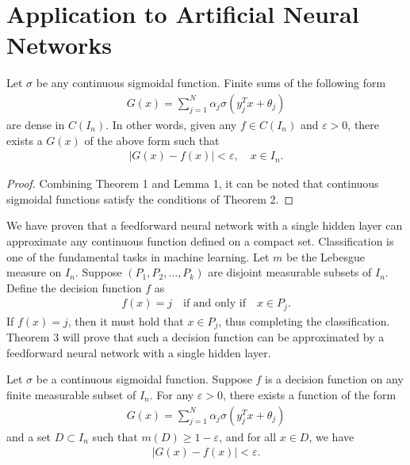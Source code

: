\documentclass[12pt]{article}
\begin{document}
\section{Application to Artificial Neural Networks}

\begin{mytheorem}
    Let $\sigma$ be any continuous sigmoidal function. Finite sums of the following form
\begin{align*}
G(x) = \sum_{j=1}^{N} \alpha_j \sigma(y_j^T x + \theta_j)
\end{align*}
are dense in $C(I_n)$. In other words, given any $f \in C(I_n)$ and $\varepsilon > 0$, there exists a $G(x)$ of the above form such that
\begin{align*}
|G(x) - f(x)| < \varepsilon, \quad x \in I_n.
\end{align*}
\end{mytheorem}

\begin{proof}
    Combining Theorem 1 and Lemma 1, it can be noted that continuous sigmoidal functions satisfy the conditions of Theorem 2.
\end{proof}

We have proven that a feedforward neural network with a single hidden layer can approximate any continuous function defined on a compact set. Classification is one of the fundamental tasks in machine learning. Let $m$ be the Lebesgue measure on $I_n$. Suppose $( P_1, P_2, \dots, P_k )$ are disjoint measurable subsets of $I_n$. Define the decision function $f$ as
\begin{align*}
    f(x) = j \quad \text{if and only if} \quad x \in P_j.
\end{align*}
If $f(x) = j$, then it must hold that $x \in P_j$, thus completing the classification. Theorem 3 will prove that such a decision function can be approximated by a feedforward neural network with a single hidden layer.
\begin{mytheorem}
    Let $\sigma$ be a continuous sigmoidal function. Suppose $f$ is a decision function on any finite measurable subset of $I_n$. For any $\varepsilon > 0$, there exists a function of the form
\begin{align*}
G(x) = \sum_{j=1}^{N} \alpha_j \sigma(y_j^T x + \theta_j)
\end{align*}
and a set $D \subset I_n$ such that $m(D) \geq 1 - \varepsilon$, and for all $x \in D$, we have
\begin{align*}
|G(x) - f(x)| < \varepsilon.
\end{align*}
\end{mytheorem}
\end{document}
